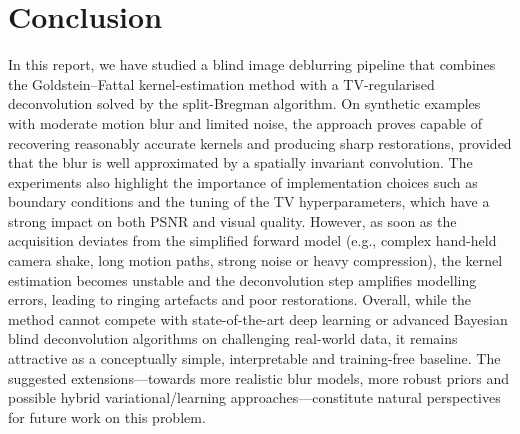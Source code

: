 \documentclass[a4paper,11pt]{article}
\begin{document}
\section{Conclusion}

In this report, we have studied a blind image deblurring pipeline that combines the Goldstein--Fattal kernel-estimation method with a TV-regularised deconvolution solved by the split-Bregman algorithm. On synthetic examples with moderate motion blur and limited noise, the approach proves capable of recovering reasonably accurate kernels and producing sharp restorations, provided that the blur is well approximated by a spatially invariant convolution. The experiments also highlight the importance of implementation choices such as boundary conditions and the tuning of the TV hyperparameters, which have a strong impact on both PSNR and visual quality. However, as soon as the acquisition deviates from the simplified forward model (e.g., complex hand-held camera shake, long motion paths, strong noise or heavy compression), the kernel estimation becomes unstable and the deconvolution step amplifies modelling errors, leading to ringing artefacts and poor restorations. Overall, while the method cannot compete with state-of-the-art deep learning or advanced Bayesian blind deconvolution algorithms on challenging real-world data, it remains attractive as a conceptually simple, interpretable and training-free baseline. The suggested extensions---towards more realistic blur models, more robust priors and possible hybrid variational/learning approaches---constitute natural perspectives for future work on this problem.


 

\end{document}
